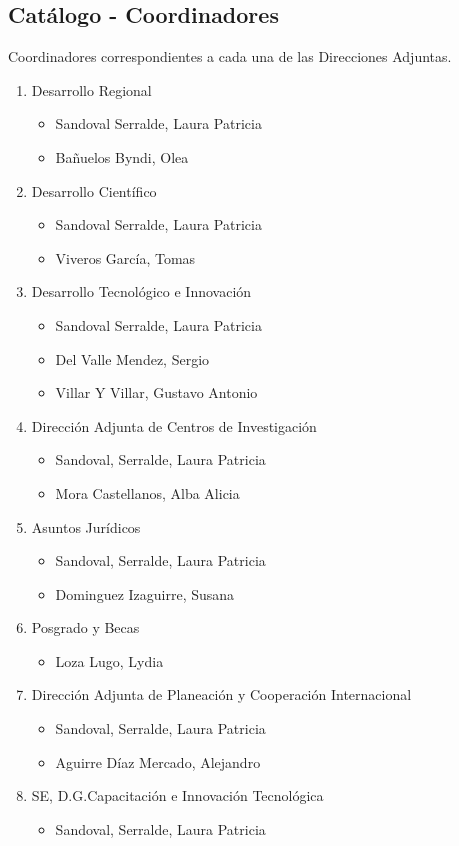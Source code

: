 \subsection{Catálogo - Coordinadores}
\label{appendix:Catalogo:Coordinadores}

Coordinadores correspondientes a cada una de las Direcciones Adjuntas.

	\begin{enumerate}
		\item Desarrollo Regional
			\begin {itemize}
				\item  Sandoval Serralde, Laura Patricia
				\item  Bañuelos Byndi, Olea
			\end {itemize}	
		\item Desarrollo Científico
			\begin {itemize}
				 \item Sandoval Serralde, Laura Patricia
				 \item Viveros García, Tomas
			\end {itemize}			
		\item Desarrollo Tecnológico e Innovación
			\begin {itemize}
				 \item Sandoval Serralde, Laura Patricia
				 \item Del Valle Mendez, Sergio
				 \item Villar Y Villar, Gustavo Antonio
			\end {itemize}
		\item Dirección Adjunta de Centros de Investigación
			\begin {itemize}
				 \item Sandoval, Serralde, Laura Patricia
				 \item Mora Castellanos, Alba Alicia
			\end {itemize}
		\item Asuntos Jurídicos
			\begin {itemize}
				 \item Sandoval, Serralde, Laura Patricia
				 \item Dominguez Izaguirre, Susana
			\end {itemize}	
		\item Posgrado y Becas
			\begin {itemize}
				 \item  Loza Lugo, Lydia
			\end {itemize}
		\item Dirección Adjunta de Planeación y Cooperación Internacional
			\begin {itemize}
				 \item  Sandoval, Serralde, Laura Patricia
				 \item Aguirre Díaz Mercado, Alejandro
			\end {itemize}
		\item SE, D.G.Capacitación e Innovación Tecnológica
			\begin {itemize}
				 \item Sandoval, Serralde, Laura Patricia
			\end {itemize}	
	\end{enumerate}
